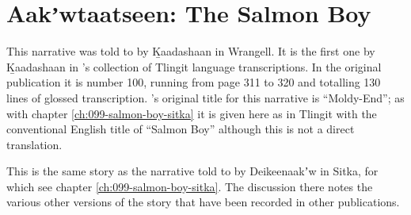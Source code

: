 
\resetexcnt
\chapter{Aakʼwtaatseen: The Salmon Boy}\label{ch:100-salmon-boy-wrg}

This narrative was told to \citeauthor{swanton:1909} by Ḵaadashaan in Wrangell.
It is the first one by Ḵaadashaan in \citeauthor{swanton:1909}’s collection of Tlingit language transcriptions.
In the original publication it is number 100, running from page 311 to 320 and totalling 130 lines of glossed transcription.
\citeauthor{swanton:1909}’s original title for this narrative is “Moldy-End”; as with chapter \ref{ch:099-salmon-boy-sitka} it is given here as  in Tlingit with the conventional English title of “Salmon Boy” although this is not a direct translation.

This is the same story as the narrative told to \citeauthor{swanton:1909} by Deikeenaakʼw in Sitka, for which see chapter \ref{ch:099-salmon-boy-sitka}.
The discussion there notes the various other versions of the story that have been recorded in other publications.

\clearpage
\setlength{\Lcolwidth}{0.471875\textwidth}
\setlength{\Rcolwidth}{0.490625\textwidth}

